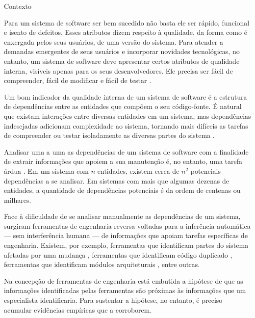 \begin{section}{Contexto}

		Para um sistema de software ser bem sucedido não basta ele ser rápido, funcional e isento de defeitos. Esses atributos dizem respeito à qualidade, da forma como é enxergada pelos seus usuários, de uma versão do sistema. Para atender a demandas emergentes de seus usuários e incorporar novidades tecnológicas, no entanto, um sistema de software deve apresentar certos atributos de qualidade interna, visíveis apenas para os seus desenvolvedores. Ele precisa ser fácil de compreender, fácil de modificar e fácil de testar \cite{Parnas1994}.

		Um bom indicador da qualidade interna de um sistema de software é a estrutura de dependências entre as entidades que compõem o seu código-fonte. É natural que existam interações entre diversas entidades em um sistema, mas dependências indesejadas adicionam complexidade ao sistema, tornando mais difíceis as tarefas de compreender ou testar isoladamente as diversas partes do sistema \cite{Chidamber1994}. %

		Analisar uma a uma as dependências de um sistema de software com a finalidade de extrair informações que apoiem a sua manutenção é, no entanto, uma tarefa árdua \cite{Tonella2007}. Em um sistema com $n$ entidades, existem cerca de $n^2$ potenciais dependências a se analisar. Em sistemas com mais que algumas dezenas de entidades, a quantidade de dependências potenciais é da ordem de centenas ou milhares. %
		
		Face à dificuldade de se analisar manualmente as dependências de um sistema, surgiram ferramentas de engenharia reversa voltadas para a inferência automática --- sem interferência humana --- de informações que apoiam tarefas específicas de engenharia. Existem, por exemplo, ferramentas que identificam partes do sistema afetadas por uma mudança \cite{Arnold1993}, ferramentas que identificam código duplicado \cite{Roy2007}, ferramentas que identificam módulos arquiteturais \cite{Maqbool2007}, entre outras. 

		Na concepção de ferramentas de engenharia está embutida a hipótese de que as informações identificadas pelas ferramentas são próximas às informações que um especialista identificaria. Para sustentar a hipótese, no entanto, é preciso acumular evidências empíricas que a corroborem.


\end{section}
